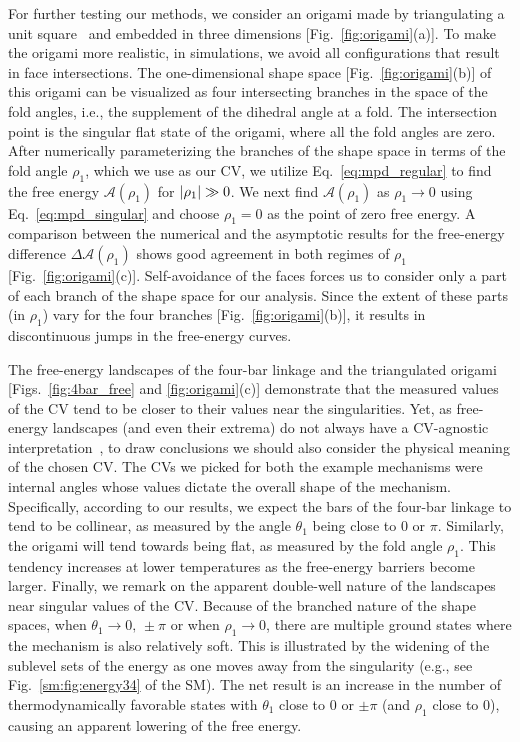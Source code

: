 For further testing our methods, we consider an origami made by triangulating a unit square~\cite{chen2018} and embedded in three dimensions [Fig.~\ref{fig:origami}(a)].
To make the origami more realistic, in simulations, we avoid all configurations that result in face intersections.
The one-dimensional shape space [Fig.~\ref{fig:origami}(b)] of this origami can be visualized as four intersecting branches in the space of the fold angles, i.e., the supplement of the dihedral angle at a fold.
The intersection point is the singular flat state of the origami, where all the fold angles are zero.
After numerically parameterizing the branches of the shape space in terms of the fold angle $\rho_{1}$, which we use as our CV, we utilize Eq.~\eqref{eq:mpd_regular} to find the free energy $\mathscr{A}(\rho_{1})$ for $\lvert\rho_{1}\rvert \gg 0$.
We next find $\mathscr{A}(\rho_{1})$ as $\rho_{1} \to 0$ using Eq.~\eqref{eq:mpd_singular} and choose $\rho_{1}=0$ as the point of zero free energy.
A comparison between the numerical and the asymptotic results for the free-energy difference  $\Delta\mathscr{A}(\rho_{1})$ shows good agreement in both regimes of $\rho_{1}$ [Fig.~\ref{fig:origami}(c)].
Self-avoidance of the faces forces us to consider only a part of each branch of the shape space for our analysis.
Since the extent of these parts (in $\rho_{1}$) vary for the four branches [Fig.~\ref{fig:origami}(b)], it results in discontinuous jumps in the free-energy curves.

The free-energy landscapes of the four-bar linkage and the triangulated origami [Figs.~\ref{fig:4bar_free} and \ref{fig:origami}(c)] demonstrate that the measured values of the CV tend to be closer to their values near the singularities.
Yet, as free-energy landscapes (and even their extrema) do not always have a CV-agnostic interpretation~\cite{e2004,hartmann2007,frenkel2013}, to draw conclusions we should also consider the physical meaning of the chosen CV.
The CVs we picked for both the example mechanisms were internal angles whose values dictate the overall shape of the mechanism.
Specifically, according to our results, we expect the bars of the four-bar linkage to tend to be collinear, as measured by the angle $\theta_1$ being close to $0$ or $\pi$.
Similarly, the origami will tend towards being flat, as measured by the fold angle $\rho_1$.
This tendency increases at lower temperatures as the free-energy barriers become larger.
Finally, we remark on the apparent double-well nature of the landscapes near singular values of the CV.
Because of the branched nature of the shape spaces, when $\theta_{1} \to 0,\,\pm\pi$ or when $\rho_{1} \to 0$, there are multiple ground states where the mechanism is also relatively soft.
This is illustrated by the widening of the sublevel sets of the energy as one moves away from the singularity (e.g., see Fig.~\ref{sm:fig:energy34} of the SM).
The net result is an increase in the number of thermodynamically favorable states with $\theta_{1}$ close to $0$ or $\pm\pi$ (and $\rho_{1}$ close to $0$), causing an apparent lowering of the free energy.

